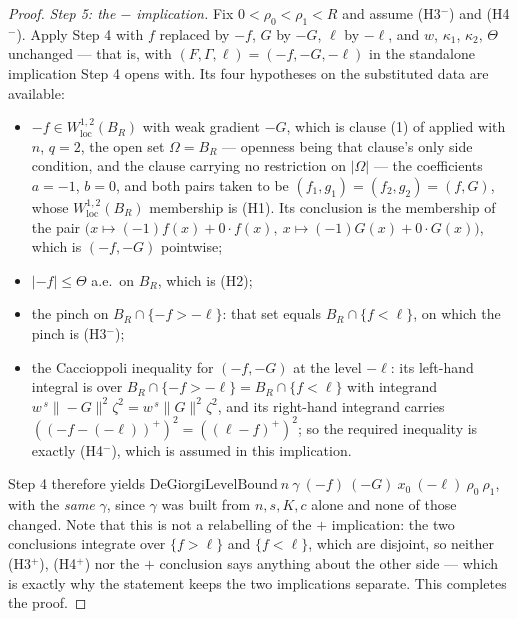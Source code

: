 \begin{proof}
\emph{Step 5: the $-$ implication.}  Fix $0<\rho_0<\rho_1<R$ and assume
(H3$^-$) and (H4$^-$).  Apply Step 4 with $f$ replaced by $-f$, $G$ by
$-G$, $\ell$ by $-\ell$, and $w$, $\kappa_1$, $\kappa_2$, $\Theta$ unchanged ---
that is, with $(F,\Gamma,\ell)=(-f,-G,-\ell)$ in the standalone implication Step
4 opens with.  Its four hypotheses on the substituted data are available:
\begin{itemize}
\item $-f\in W^{1,2}_{\mathrm{loc}}(B_R)$ with weak gradient $-G$, which is
  clause (1) of  applied with $n$, $q=2$, the open
  set $\Omega=B_R$ --- openness being that clause's only side condition, and the
  clause carrying no restriction on $|\Omega|$ --- the coefficients $a=-1$,
  $b=0$, and both pairs taken to be $(f_1,g_1)=(f_2,g_2)=(f,G)$, whose
  $W^{1,2}_{\mathrm{loc}}(B_R)$ membership is (H1).  Its conclusion is the
  membership of the pair
  $\bigl(x\mapsto(-1)f(x)+0\cdot f(x),\ x\mapsto(-1)G(x)+0\cdot G(x)\bigr)$,
  which is $(-f,-G)$ pointwise;
\item $|-f|\le\Theta$ a.e.\ on $B_R$, which is (H2);
\item the pinch on $B_R\cap\{-f>-\ell\}$: that set equals
  $B_R\cap\{f<\ell\}$, on which the pinch is (H3$^-$);
\item the Caccioppoli inequality for $(-f,-G)$ at the level $-\ell$: its
  left-hand integral is over $B_R\cap\{-f>-\ell\}=B_R\cap\{f<\ell\}$ with
  integrand $w^{\,s}\|-G\|^2\zeta^2=w^{\,s}\|G\|^2\zeta^2$, and its right-hand
  integrand carries $((-f-(-\ell))^+)^2=((\ell-f)^+)^2$; so the required
  inequality is exactly (H4$^-$), which is assumed in this implication.
\end{itemize}
Step 4 therefore yields
$\mathrm{DeGiorgiLevelBound}\ n\ \gamma\ (-f)\ (-G)\ x_0\ (-\ell)\ \rho_0\
\rho_1$, with the \emph{same} $\gamma$, since $\gamma$ was built from
$n,s,K,c$ alone and none of those changed.  Note that this is not a relabelling
of the $+$ implication: the two conclusions integrate over
$\{f>\ell\}$ and $\{f<\ell\}$, which are disjoint, so neither (H3$^+$),
(H4$^+$) nor the $+$ conclusion says anything about the other side --- which is
exactly why the statement keeps the two implications separate.  This completes
the proof.
\end{proof}

